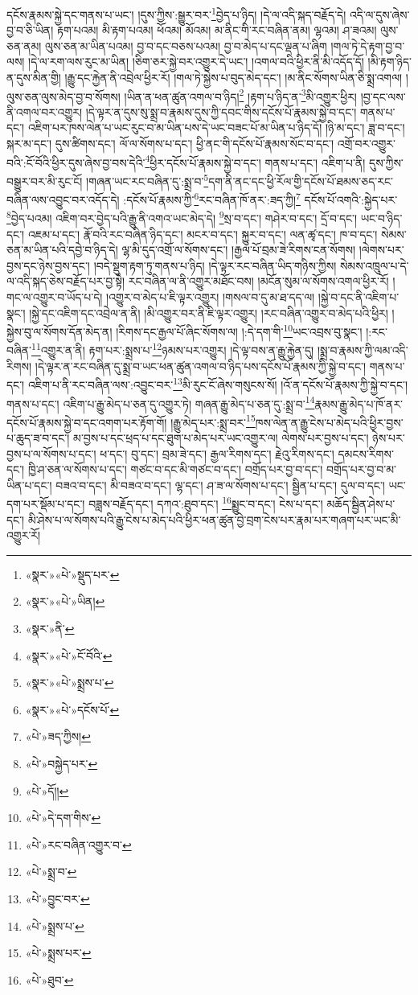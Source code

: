 དངོས་རྣམས་སྐྱེ་དང་གནས་པ་ཡང་། །དུས་ཀྱིས་:སྒྱུར་བར་\footnote{«སྣར་»«པེ་»སྡུད་པར་}བྱེད་པ་ཉིད། །དེ་ལ་འདི་སྐད་བརྗོད་དེ། འདི་ལ་དུས་ཞེས་བྱ་བ་ཅི་ཡིན། རྟག་པའམ། མི་རྟག་པའམ། ཕོའམ། མོའམ། མ་ནིང་གི་རང་བཞིན་ནམ། ལྷའམ། ཤ་ཟའམ། ལུས་ཅན་ནམ། ལུས་ཅན་མ་ཡིན་པའམ། བྱ་བ་དང་བཅས་པའམ། བྱ་བ་མེད་པ་དང་ལྡན་པ་ཞིག །གལ་ཏེ་དེ་རྟག་བྱ་བ་ལས། །དེ་ལ་རག་ལས་རུང་མ་ཡིན། །ཅིག་ཅར་སྐྱེ་བར་འགྱུར་དེ་ཡང་། །འགལ་བའི་ཕྱིར་ནི་མི་འདོད་དོ། །མི་རྟག་ཉིད་ན་དུས་མིན་གྱི། །རྒྱུ་དང་རྐྱེན་ནི་འབྲེལ་ཕྱིར་རོ། །གལ་ཏེ་སྐྱེས་པ་བུད་མེད་དང་། །མ་ནིང་སོགས་ཡིན་ཅི་སྨྲ་འགལ། །ལུས་ཅན་ལུས་མེད་བྱ་བ་སོགས། །ཡིན་ན་ཕན་ཚུན་འགལ་བ་ཉིད།\footnote{«སྣར་»«པེ་»ཡིན།} །རྟག་པ་ཉིད་ན་\footnote{«སྣར་»ནི་}མི་འགྱུར་ཕྱིར། །བྱ་དང་ལས་ནི་འགལ་བར་འགྱུར། །དེ་ལྟར་ན་དུས་སུ་སྨྲ་བ་རྣམས་དུས་ཀྱི་དབང་གིས་དངོས་པོ་རྣམས་སྐྱེ་བ་དང་། གནས་པ་དང་། འཇིག་པར་ཁས་ལེན་པ་ཡང་རུང་བ་མ་ཡིན་པས་དེ་ཡང་བཟང་པོ་མ་ཡིན་པ་ཉིད་དོ། །ཉི་མ་དང་། ཟླ་བ་དང་། སྐར་མ་དང་། དུས་ཚིགས་དང་། ལོ་ལ་སོགས་པ་དང་། ཕྱི་ནང་གི་དངོས་པོ་རྣམས་སོང་བ་དང་། འགྲོ་བར་འགྱུར་བའི་:ངོ་བོའི་ཕྱིར་དུས་ཞེས་བྱ་བས་དེའི་\footnote{«སྣར་»«པེ་»ངོ་བོའི་}ཕྱིར་དངོས་པོ་རྣམས་སྐྱེ་བ་དང་། གནས་པ་དང་། འཇིག་པ་ནི། དུས་ཀྱིས་བསྒྱུར་བར་མི་རུང་ངོ། །གཞན་ཡང་རང་བཞིན་དུ་:སྨྲ་བ་\footnote{«སྣར་»«པེ་»སྨྲས་པ་}དག་ནི་ནང་དང་ཕྱི་རོལ་གྱི་དངོས་པོ་ཐམས་ཅད་རང་བཞིན་ལས་འབྱུང་བར་འདོད་དེ། :དངོས་པོ་རྣམས་ཀྱི་\footnote{«སྣར་»«པེ་»དངོས་པོ་}རང་བཞིན་ཁོ་ནར་:ཟད་ཀྱི།\footnote{«པེ་»ཟད་ཀྱིས།} དངོས་པོ་འགའི་:སྐྱེད་པར་\footnote{«པེ་»བསྐྱེད་པར་}བྱེད་པའམ། འཇིག་བར་བྱེད་པའི་རྒྱུ་ནི་འགའ་ཡང་མེད་དེ། \footnote{«པེ་»དོ།། }སྲ་བ་དང་། གཤེར་བ་དང་། དྲོ་བ་དང་། ཡང་བ་ཉིད་དང་། འཇམ་པ་དང་། རྣོ་བའི་རང་བཞིན་ཉིད་དང་། མངར་བ་དང་། སྐྱུར་བ་དང་། ལན་ཚྭ་དང་། ཁ་བ་དང་། སེམས་ཅན་མ་ཡིན་པའི་དབྱེ་བ་ཉིད་དེ། ལྷ་མི་དུད་འགྲོ་ལ་སོགས་དང་། །རྒྱལ་པོ་བྲམ་ཟེ་རིགས་ངན་སོགས། །ལེགས་པར་བྱས་དང་ཉེས་བྱས་དང་། །བདེ་སྡུག་རྟག་ཏུ་གནས་པ་ཉིད། །དེ་ལྟར་རང་བཞིན་ཡིད་གཉིས་ཀྱིས། སེམས་འཁྲུལ་པ་དེ་ལ་འདི་སྐད་ཅེས་བརྗོད་པར་བྱ་སྟེ། རང་བཞིན་ལ་ནི་འགྱུར་མཐོང་བས། །མངོན་སུམ་ལ་སོགས་འགལ་ཕྱིར་རོ། །གང་ལ་འགྱུར་བ་ཡོད་པ་དེ། །འགྱུར་བ་མེད་པ་ཇི་ལྟར་འགྱུར། །གསལ་བ་དུ་མ་ཐ་དད་ལ། །སྐྱེ་བ་དང་ནི་འཇིག་པ་སྣང་། །སྐྱེ་དང་འཇིག་དང་འབྲེལ་ན་ནི། །མི་འགྱུར་བར་ནི་ཇི་ལྟར་འགྱུར། །རང་བཞིན་འགྱུར་བ་མེད་པའི་ཕྱིར། །སྐྱེས་བུ་ལ་སོགས་དོན་མེད་ན། །རིགས་དང་རྒྱལ་པོ་ཞིང་སོགས་ལ། །:དེ་དག་གི་\footnote{«པེ་»དེ་དག་གིས་}ཡང་འབྲས་བུ་སྣང་། །:རང་བཞིན་\footnote{«པེ་»རང་བཞིན་འགྱུར་བ་}འགྱུར་ན་ནི། རྟག་པར་:སྨྲས་པ་\footnote{«པེ་»སྨྲ་བ་}ཉམས་པར་འགྱུར། །དེ་ལྟ་བས་ན་རྒྱུ་རྐྱེན་དུ། །སྨྲ་བ་རྣམས་ཀྱི་ལམ་འདི་རིགས། །དེ་ལྟར་ན་རང་བཞིན་དུ་སྨྲ་བ་ཡང་ཕན་ཚུན་འགལ་བ་ཉིད་པས་དངོས་པོ་རྣམས་ཀྱི་སྐྱེ་བ་དང་། གནས་པ་དང་། འཇིག་པ་ནི་རང་བཞིན་ལས་:འབྱུང་བར་\footnote{«པེ་»བྱུང་བར་}མི་རུང་ངོ་ཞེས་གསུངས་སོ། །འོ་ན་དངོས་པོ་རྣམས་ཀྱི་སྐྱེ་བ་དང་། གནས་པ་དང་། འཇིག་པ་རྒྱུ་མེད་པ་ཅན་དུ་འགྱུར་ཏེ། གཞན་རྒྱུ་མེད་པ་ཅན་དུ་:སྨྲ་བ་\footnote{«པེ་»སྨྲས་པ་}རྣམས་རྒྱུ་མེད་པ་ཁོ་ནར་དངོས་པོ་རྣམས་སྐྱེ་བ་དང་འགག་པར་རྟོག་གོ། །རྒྱུ་མེད་པར་:སྨྲ་བར་\footnote{«པེ་»སྨྲས་པར་}ཁས་ལེན་ན་རྒྱུ་ངེས་པ་མེད་པའི་ཕྱིར་བྱས་པ་ཆུད་ཟ་བ་དང་། མ་བྱས་པ་དང་ཕྲད་པ་དང་ཐུག་པ་མེད་པར་ཡང་འགྱུར་ལ། ལེགས་པར་བྱས་པ་དང་། ཉེས་པར་བྱས་པ་ལ་སོགས་པ་དང་། ཕ་དང་། བུ་དང་། བྲམ་ཟེ་དང་། རྒྱལ་རིགས་དང་། རྗེའུ་རིགས་དང་། དམངས་རིགས་དང་། ཁྱི་ཤ་ཅན་ལ་སོགས་པ་དང་། གཙང་བ་དང་མི་གཙང་བ་དང་། བགྲོད་པར་བྱ་བ་དང་། བགྲོད་པར་བྱ་བ་མ་ཡིན་པ་དང་། བཟའ་བ་དང་། མི་བཟའ་བ་དང་། ལྷ་དང་། ཤ་ཟ་ལ་སོགས་པ་དང་། སྦྱིན་པ་དང་། དུལ་བ་དང་། ཡང་དག་པར་སྡོམ་པ་དང་། བཟླས་བརྗོད་དང་། དཀའ་:ཐུབ་དང་། \footnote{«པེ་»ཐུབ་}སྨྱུང་བ་དང་། ངེས་པ་དང་། མཆོད་སྦྱིན་ཤེས་པ་དང་། མི་ཤེས་པ་ལ་སོགས་པའི་རྒྱུ་ངེས་པ་མེད་པའི་ཕྱིར་ཕན་ཚུན་བྱེ་བྲག་ངེས་པར་རྣམ་པར་གཞག་པར་ཡང་མི་འགྱུར་རོ། 